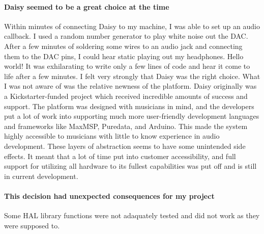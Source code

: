 \documentclass[acmlarge,screen]{acmart}
\begin{document}
	\paragraph{Daisy seemed to be a great choice at the time} Within minutes of connecting Daisy to my machine, I was able to set up an audio callback. I used a random number generator to play white noise out the DAC. After a few minutes of soldering some wires to an audio jack and connecting them to the DAC pins, I could hear static playing out my headphones. Hello world! It was exhilarating to write only a few lines of code and hear it come to life after a few minutes. I felt very strongly that Daisy was the right choice. What I was not aware of was the relative newness of the platform. Daisy originally was a Kickstarter-funded project which received incredible amounts of success and support. The platform was designed with musicians in mind, and the developers put a lot of work into supporting much more user-friendly development languages and frameworks like MaxMSP, Puredata, and Arduino. This made the system highly accessible to musicians with little to know experience in audio development. These layers of abstraction seems to have some unintended side effects. It meant that a lot of time put into customer accessibility, and full support for utilizing all hardware to its fullest capabilities was put off and is still in current development.

	\paragraph{This decision had unexpected consequences for my project} Some HAL library functions were not adaquately tested and did not work as they were supposed to.
\end{document}
